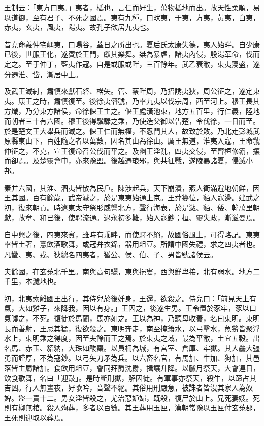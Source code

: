 
\begin{pinyinscope}
王制云：「東方曰夷。」夷者，柢也，言仁而好生，萬物柢地而出。故天性柔順，易以道御，至有君子、不死之國焉。夷有九種，曰畎夷，于夷，方夷，黃夷，白夷，赤夷，玄夷，風夷，陽夷。故孔子欲居九夷也。

昔堯命羲仲宅嵎夷，曰暘谷，蓋日之所出也。夏后氏太康失德，夷人始畔。自少康已後，世服王化，遂賓於王門，獻其樂舞。桀為暴虐，諸夷內侵，殷湯革命，伐而定之。至于仲丁，藍夷作寇。自是或服或畔，三百餘年。武乙衰敝，東夷寖盛，遂分遷淮、岱，漸居中土。

及武王滅紂，肅慎來獻石砮、楛矢。管、蔡畔周，乃招誘夷狄，周公征之，遂定東夷。康王之時，肅慎復至。後徐夷僭號，乃率九夷以伐宗周，西至河上。穆王畏其方熾，乃分東方諸侯，命徐偃王主之。偃王處潢池東，地方五百里，行仁義，陸地而朝者三十有六國。穆王後得驥騄之乘，乃使造父御以告楚，令伐徐，一日而至。於是楚文王大舉兵而滅之。偃王仁而無權，不忍鬥其人，故致於敗。乃北走彭城武原縣東山下，百姓隨之者以萬數，因名其山為徐山。厲王無道，淮夷入寇，王命虢仲征之，不克，宣王復命召公伐而平之。及幽王淫亂，四夷交侵，至齊桓修霸，攘而卻焉。及楚靈會申，亦來豫盟。後越遷琅邪，與共征戰，遂陵暴諸夏，侵滅小邦。

秦并六國，其淮、泗夷皆散為民戶。陳涉起兵，天下崩潰，燕人衛滿避地朝鮮，因王其國。百有餘歲，武帝滅之，於是東夷始通上京。王莽篡位，貊人寇邊。建武之初，復來朝貢。時遼東太守祭肜威讋北方，聲行海表，於是濊、貊、倭、韓萬里朝獻，故章、和已後，使聘流通。逮永初多難，始入寇鈔；桓、靈失政，漸滋曼焉。

自中興之後，四夷來賓，雖時有乖畔，而使驛不絕，故國俗風土，可得略記。東夷率皆土著，憙飲酒歌舞，或冠弁衣錦，器用俎豆。所謂中國失禮，求之四夷者也。凡蠻、夷、戎、狄總名四夷者，猶公、侯、伯、子、男皆號諸侯云。

夫餘國，在玄菟北千里。南與高句驪，東與挹婁，西與鮮卑接，北有弱水。地方二千里，本濊地也。

初，北夷索離國王出行，其侍兒於後妊身，王還，欲殺之。侍兒曰：「前見天上有氣，大如雞子，來降我，因以有身。」王囚之，後遂生男。王令置於豕牢，豕以口氣噓之，不死。復徙於馬蘭，馬亦如之。王以為神，乃聽母收養，名曰東明。東明長而善射，王忌其猛，復欲殺之。東明奔走，南至掩箫水，以弓擊水，魚鱉皆聚浮水上，東明乘之得度，因至夫餘而王之焉。於東夷之域，最為平敞，土宜五穀。出名馬、赤玉、貂豽，大珠如酸棗。以員柵為城，有宮室、倉庫、牢獄。其人麤大彊勇而謹厚，不為寇鈔。以弓矢刀矛為兵。以六畜名官，有馬加、牛加、狗加，其邑落皆主屬諸加。食飲用俎豆，會同拜爵洗爵，揖讓升降。以臘月祭天，大會連日，飲食歌舞，名曰「迎鼓」。是時斷刑獄，解囚徒。有軍事亦祭天，殺牛，以蹄占其吉凶。行人無晝夜，好歌吟，音聲不絕。其俗用刑嚴急，被誅者皆沒其家人為奴婢。盜一責十二。男女淫皆殺之，尤治惡妒婦，既殺，復尸於山上。兄死妻嫂。死則有槨無棺。殺人殉葬，多者以百數。其王葬用玉匣，漢朝常豫以玉匣付玄菟郡，王死則迎取以葬焉。


\end{pinyinscope}
